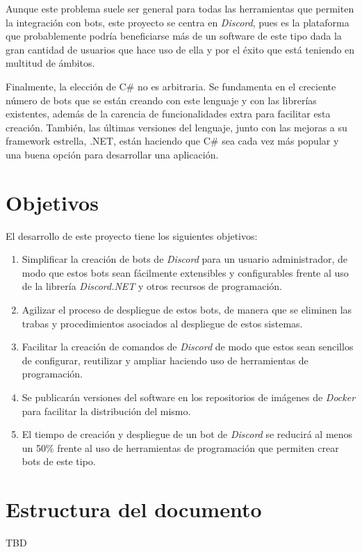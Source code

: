 Aunque este problema suele ser general para todas las herramientas que permiten la integración con bots, este proyecto se centra en \textit{Discord}, pues es la plataforma que probablemente podría beneficiarse más de un software de este tipo dada la gran cantidad de usuarios que hace uso de ella y por el éxito\cite{enlyft} que está teniendo en multitud de ámbitos.

Finalmente, la elección de C\# no es arbitraria. Se fundamenta en el creciente número de bots que se están creando con este lenguaje y con las librerías existentes, además de la carencia de funcionalidades extra para facilitar esta creación. También, las últimas versiones del lenguaje, junto con las mejoras a su framework estrella, .NET, están haciendo que C\# sea cada vez más popular y una buena opción para desarrollar una aplicación.

\section{Objetivos}

El desarrollo de este proyecto tiene los siguientes objetivos:

\begin{enumerate}
	\item Simplificar la creación de bots de \textit{Discord} para un usuario administrador, de modo que estos bots sean fácilmente extensibles y configurables frente al uso de la librería \textit{Discord.NET} y otros recursos de programación.
	\item Agilizar el proceso de despliegue de estos bots, de manera que se eliminen las trabas y procedimientos asociados al despliegue de estos sistemas.
	\item Facilitar la creación de comandos de \textit{Discord} de modo que estos sean sencillos de configurar, reutilizar y ampliar haciendo uso de herramientas de programación.
	\item Se publicarán versiones del software en los repositorios de imágenes de \textit{Docker} para facilitar la distribución del mismo.
	\item El tiempo de creación y despliegue de un bot de \textit{Discord} se reducirá al menos un 50\% frente al uso de herramientas de programación que permiten crear bots de este tipo.
\end{enumerate}

\section{Estructura del documento}

TBD

